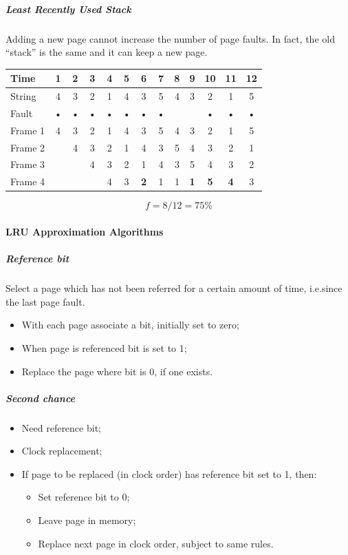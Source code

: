 \subparagraph{Least Recently Used Stack}
Adding a new page cannot increase the number of page faults. In fact, the old ``stack'' is the same and it can keep a new page.
\begin{center}
\begin{tabular}{l|cccccccccccc}
\hline 
Time & 1 & 2 & 3 & 4 & 5 & 6 & 7 & 8 & 9 & 10 & 11 & 12 \\ 
\hline 
String & 4 & 3 & 2 & 1 & 4 & 3 & 5 & 4 & 3 & 2 & 1 & 5 \\ 
\hline 
Fault & • & • & • & • & • & • & • & & & • & • & • \\ 
\hline 
Frame 1 & 4 & 3 & 2 & 1 & 4 & 3 & 5 & 4 & 3 & 2 & 1 & 5 \\ 
Frame 2 & & 4 & 3 & 2 & 1 & 4 & 3 & 5 & 4 & 3 & 2 & 1 \\ 
Frame 3 & & & 4 & 3 & 2 & 1 & 4 & 3 & 5 & 4 & 3 & 2 \\ 
Frame 4 & & & & 4 & 3 & \textbf{2} & 1 & 1 & \textbf{1} & \textbf{5} & \textbf{4} & 3 \\ 
\hline
\end{tabular} 
\[ f = 8/12 = 75 \% \]
\end{center}

\paragraph{LRU Approximation Algorithms}
\subparagraph{Reference bit}
Select a page which has not been referred for a certain amount of time, i.e.\@ since the last page fault.
\begin{itemize}
\item With each page associate a bit, initially set to zero;
\item When page is referenced bit is set to 1;
\item Replace the page where bit is 0, if one exists.
\end{itemize}
\subparagraph{Second chance}
\begin{itemize}
\item Need reference bit;
\item Clock replacement;
\item If page to be replaced (in clock order) has reference bit set to 1, then:
\begin{itemize}
\item Set reference bit to 0;
\item Leave page in memory;
\item Replace next page in clock order, subject to same rules.
\end{itemize}
\end{itemize}

